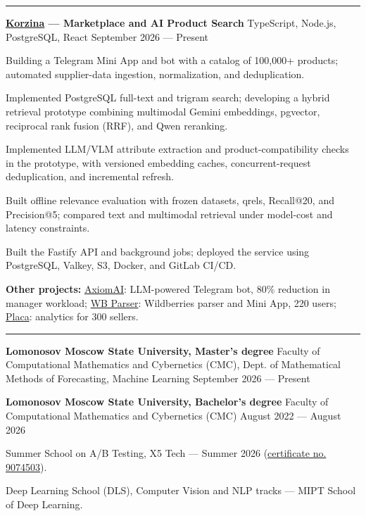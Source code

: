 \documentclass[10pt,a4paper]{article}
\newcommand{\cvsection}[1]{%
  \vspace{5pt}{\large\bfseries #1}\par\vspace{2pt}\hrule\vspace{3pt}}
\newcommand{\cventry}[3]{%
  \textbf{#1} \textbar{} #3 \textbar{} #2\par\vspace{1pt}}
\begin{document}
\cvsection{Projects}
\cventry{\href{https://github.com/noobmaster-ru/korzina-market}{Korzina} --- Marketplace and AI Product Search}{September 2026 --- Present}{TypeScript, Node.js, PostgreSQL, React}
\begin{cvitems}
    \item Building a Telegram Mini App and bot with a catalog of 100,000+ products; automated supplier-data ingestion, normalization, and deduplication.
    \item Implemented PostgreSQL full-text and trigram search; developing a hybrid retrieval prototype combining multimodal Gemini embeddings, pgvector, reciprocal rank fusion (RRF), and Qwen reranking.
    \item Implemented LLM/VLM attribute extraction and product-compatibility checks in the prototype, with versioned embedding caches, concurrent-request deduplication, and incremental refresh.
    \item Built offline relevance evaluation with frozen datasets, qrels, Recall@20, and Precision@5; compared text and multimodal retrieval under model-cost and latency constraints.
    \item Built the Fastify API and background jobs; deployed the service using PostgreSQL, Valkey, S3, Docker, and GitLab CI/CD.
\end{cvitems}
\textbf{Other projects:} \href{https://github.com/noobmaster-ru/axiomai}{AxiomAI}: LLM-powered Telegram bot, 80\% reduction in manager workload; \href{https://github.com/noobmaster-ru/tg-mini-app-backend}{WB Parser}: Wildberries parser and Mini App, 220 users; \href{https://github.com/noobmaster-ru/wb_tables}{Placa}: analytics for 300 sellers.\par

\cvsection{Education}
\cventry{Lomonosov Moscow State University, Master's degree}{September 2026 --- Present}{Faculty of Computational Mathematics and Cybernetics (CMC), Dept. of Mathematical Methods of Forecasting, Machine Learning}
\vspace{2pt}
\cventry{Lomonosov Moscow State University, Bachelor's degree}{August 2022 --- August 2026}{Faculty of Computational Mathematics and Cybernetics (CMC)}
\begin{cvitems}
    \item Summer School on A/B Testing, X5 Tech --- Summer 2026 (\href{https://drive.google.com/file/d/1mUnPwkYkO6VxMJelwePo0Ie6PKA6IBot/view?usp=sharing}{certificate no. 9074503}).
    \item Deep Learning School (DLS), Computer Vision and NLP tracks --- MIPT School of Deep Learning.
\end{cvitems}
\end{document}
